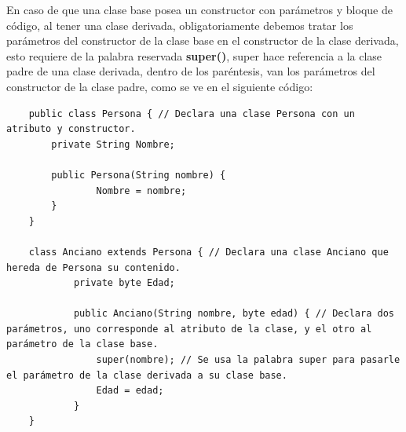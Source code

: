 En caso de que una clase base posea un constructor con parámetros y bloque de código, al tener una clase derivada, obligatoriamente debemos tratar los parámetros del constructor de la clase base en el constructor de la clase derivada, esto requiere de la palabra reservada \textbf{super()}, super hace referencia a la clase padre de una clase derivada, dentro de los paréntesis, van los parámetros del constructor de la clase padre, como se ve en el siguiente código:
\begin{lstlisting}
    public class Persona { // Declara una clase Persona con un atributo y constructor.
        private String Nombre;
        
        public Persona(String nombre) {
        		Nombre = nombre;
        }
    }
    
    class Anciano extends Persona { // Declara una clase Anciano que hereda de Persona su contenido.
    		private byte Edad;
    		
    		public Anciano(String nombre, byte edad) { // Declara dos parámetros, uno corresponde al atributo de la clase, y el otro al parámetro de la clase base.
    			super(nombre); // Se usa la palabra super para pasarle el parámetro de la clase derivada a su clase base.
    			Edad = edad;
    		}
    }
\end{lstlisting}


